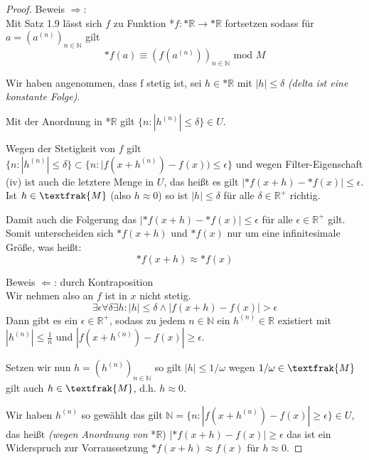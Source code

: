 \documentclass[a4paper]{article}
\begin{document}
\begin{proof}
      Beweis $ \Rightarrow $: \\
      Mit Satz 1.9 lässt sich $ f $ zu Funktion *$f: \text{*}\mathbb{R} \to \text{*}\mathbb{R} $ fortsetzen sodass für 
      $ a = (a^{(n)})_{n\in\mathbb{N}} $ gilt 
      $$ \text{*}f(a) \equiv (f(a^{(n)}))_{n\in\mathbb{N}} \text{ mod } M $$

      \smallskip
      Wir haben angenommen, dass f stetig ist, sei $ h \in \text{*}\mathbb{R} $ mit $ |h| \leqslant \delta $ \textit{(delta ist eine konstante Folge)}.

      \smallskip
      Mit der Anordnung in *$\mathbb{R}$ gilt $ \{n: |h^{(n)}| \leqslant \delta\} \in U $. 
      
      \smallskip
      Wegen der Stetigkeit von $ f $ gilt
      $ \{n: |h^{(n)}| \leqslant \delta\} \subset \{n: |f(x + h^{(n)}) - f(x)) \leqslant \epsilon\} $ 
      und wegen Filter-Eigenschaft (iv) ist auch die letztere Menge in $ U $, das 
      heißt es gilt $ |\text{*}f(x + h) - \text{*}f(x)| \leqslant \epsilon $. Ist $ h \in \textfrak{M} $ 
      (also $ h \approx 0 $) so ist $ |h| \leqslant \delta $ für alle $ \delta \in \mathbb{R}^+ $ richtig. 

      Damit auch die Folgerung das $ |\text{*}f(x + h) - \text{*}f(x)| \leqslant \epsilon $ für alle
      $ \epsilon \in  \mathbb{R}^+ $ gilt. Somit unterscheiden sich $ \text{*}f(x + h) $ und $  \text{*}f(x) $ nur
      um eine infinitesimale Größe, was heißt:
      $$ \text{*}f(x + h) \approx *f(x) $$

      Beweis $ \Leftarrow $: durch Kontraposition \\
      Wir nehmen also an $ f $ ist in $ x $ nicht stetig. 
      $$ \exists \epsilon \forall \delta \exists h: |h| \leqslant \delta \wedge |f(x + h) - f(x)| > \epsilon $$
      Dann gibt es ein $ \epsilon \in \mathbb{R}^+ $, sodass 
      zu jedem $ n \in \mathbb{N} $ ein $ h^{(n)} \in \mathbb{R} $ existiert mit $ |h^{(n)}| \leqslant \frac{1}{n} $
      und $ |f(x + h^{(n)}) - f(x)| \geq \epsilon $. 

      \smallskip
      Setzen wir nun $ h = (h^{(n)})_{n\in\mathbb{N}} $ so gilt $ |h| \leqslant 1/\omega $ wegen 
      $ 1/\omega \in \textfrak{M} $ gilt auch $ h \in \textfrak{M} $, d.h. $ h \approx 0 $.

      \smallskip
      Wir haben $ h^{(n)} $ so gewählt das gilt $ \mathbb{N} = \{n: |f(x + h^{(n)}) - f(x)| \geq \epsilon \} \in U $,
      das heißt \textit{(wegen Anordnung von }*$\mathbb{R}$) $ |\text{*}f(x + h) - f(x)| \geq \epsilon $ das ist ein Widerspruch zur Vorraussetzung 
      $\text{*}f(x + h) \approx f(x) $ für $ h \approx 0$. 


\end{proof}
\end{document}
